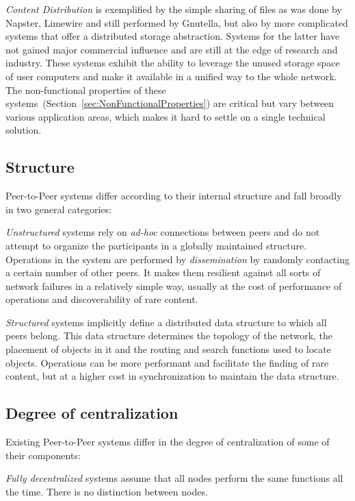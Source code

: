 \textit{Content Distribution} is exemplified by the simple sharing of files as was done by Napster, Limewire and still performed by Gnutella, but also by more complicated systems that offer a distributed storage abstraction. Systems for the latter have not gained major commercial influence and are still at the edge of research and industry. These systems exhibit the ability to leverage the unused storage space of user computers and make it available in a unified way to the whole network. The non-functional properties of these systems~(Section~\ref{sec:NonFunctionalProperties}) are critical but vary between various application areas, which makes it hard to settle on a single technical solution.  

\subsection{Structure}

Peer-to-Peer systems differ according to their internal structure and fall broadly in two general categories: 

\textit{Unstructured} systems rely on \textit{ad-hoc} connections between peers and do not attempt to organize the participants in a globally maintained structure. Operations in the system are performed by \textit{dissemination} by randomly contacting a certain number of other peers. It makes them resilient against all sorts of network failures in a relatively simple way, usually at the cost of performance of operations and discoverability of rare content.

\textit{Structured} systems implicitly define a distributed data structure to which all peers belong. This data structure determines the topology of the network, the placement of objects in it and the routing and search functions used to locate objects. Operations can be more performant and facilitate the finding of rare content, but at a higher cost in synchronization to maintain the data structure.

\subsection{Degree of centralization}

Existing Peer-to-Peer systems differ in the degree of centralization of some of their components:

\textit{Fully decentralized} systems assume that all nodes perform the same functions all the time. There is no distinction between nodes.

